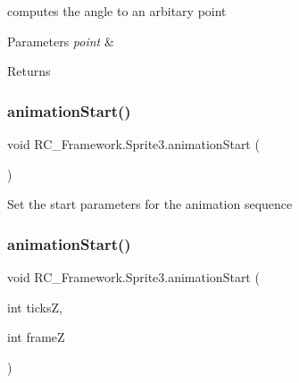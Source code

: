 computes the angle to an arbitary point 


\begin{DoxyParams}{Parameters}
{\em point} & \\
\hline
\end{DoxyParams}
\begin{DoxyReturn}{Returns}

\end{DoxyReturn}
\mbox{\label{class_r_c___framework_1_1_sprite3_ab181bdcfd7b9fcb12a931c13d2649d93}} 
\subsubsection{\texorpdfstring{animation\+Start()}{animationStart()}\hspace{0.1cm}{\footnotesize\ttfamily [1/2]}}
{\footnotesize\ttfamily void R\+C\+\_\+\+Framework.\+Sprite3.\+animation\+Start (\begin{DoxyParamCaption}{ }\end{DoxyParamCaption})}



Set the start parameters for the animation sequence 

\mbox{\label{class_r_c___framework_1_1_sprite3_abaab134b0035e614af80fa1755118fd2}} 
\subsubsection{\texorpdfstring{animation\+Start()}{animationStart()}\hspace{0.1cm}{\footnotesize\ttfamily [2/2]}}
{\footnotesize\ttfamily void R\+C\+\_\+\+Framework.\+Sprite3.\+animation\+Start (\begin{DoxyParamCaption}\item[{int}]{ticksZ,  }\item[{int}]{frameZ }\end{DoxyParamCaption})}



